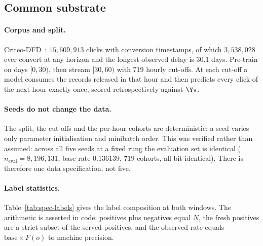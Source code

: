 \begin{table}[h]
\caption{Every method against the rules. \textsuperscript{1b} marks a soft target admissible under
Rule~1b. Records per click are measured over a full 720-hour replay; note that the count does not
determine Rule~1a, since \textsc{Oracle} writes one record and still reads the future}
\label{tab:spec-compliance}
\centering\small

\end{table}

\subsection{Common substrate}\label{app:substrate}

\paragraph{Corpus and split.} Criteo-DFD~\cite{chapelle2014modeling}: $15{,}609{,}913$ clicks with
conversion timestamps, of which $3{,}538{,}028$ ever convert at any horizon and the longest
observed delay is $30.1$ days. Pre-train on days $[0,30)$, then stream $[30,60)$ with $719$ hourly
cut-offs. At each cut-off a model consumes the records released in that hour and then predicts
every click of the next hour exactly once, scored retrospectively against $\Yv$.

\paragraph{Seeds do not change the data.} The split, the cut-offs and the per-hour cohorts are
deterministic; a seed varies only parameter initialisation and minibatch order. This was verified
rather than assumed: across all five seeds at a fixed rung the evaluation set is identical
($n_{\text{eval}} = 8{,}196{,}131$, base rate $0.136139$, $719$ cohorts, all bit-identical). There
is therefore one data specification, not five.

\paragraph{Label statistics.} Table~\ref{tab:spec-labels} gives the label composition at both
windows. The arithmetic is asserted in code: positives plus negatives equal $N$, the fresh
positives are a strict subset of the served positives, and the observed rate equals
$\text{base} \times F(o)$ to machine precision.

\begin{table}[h]
\caption{Label composition of the replay at both windows. $\Yo$ does not depend on $v$, so the
fresh label is identical at both; only the target it must predict moves}
\label{tab:spec-labels}
\centering\small

\end{table}

